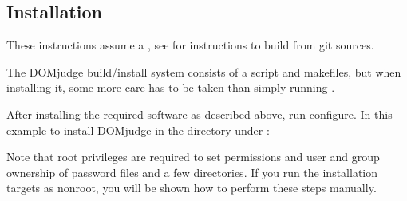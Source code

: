 \documentclass[a4paper,10pt,english,openany]{sphinxmanual}
\begin{document}
\begin{sphinxVerbatim}[commandchars=\\\{\}]
          \PYGZbs{}
           \PYGZbs{}
         
\end{sphinxVerbatim}


\subsection{Installation}
\label{\detokenize{install-domserver:installation}}
\sphinxAtStartPar
These instructions assume a , see {\hyperref[\detokenize{develop:bootstrap}]{}}
for instructions to build from git sources.

\sphinxAtStartPar
The DOMjudge build/install system consists of a 
script and makefiles, but when installing it, some more care has to be
taken than simply running .

\sphinxAtStartPar
After installing the required software as described above, run configure.
In this example to install DOMjudge in the directory  under
:

\begin{sphinxVerbatim}[commandchars=\\\{\}]
 
 
  
\end{sphinxVerbatim}

\sphinxAtStartPar
Note that root privileges are required to set permissions and user and
group ownership of password files and a few directories. If you run
the installation targets as non\sphinxhyphen{}root, you will be shown how to perform
these steps manually.
\end{document}
